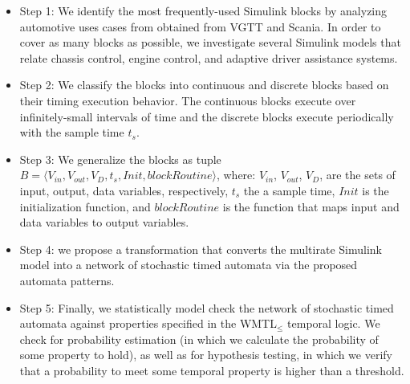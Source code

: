 \begin{itemize}
    \item Step 1: We identify the most frequently-used Simulink blocks by analyzing automotive uses cases from obtained from VGTT and Scania. In order to cover as many blocks as possible,  we investigate several Simulink models that relate chassis control, engine control, and adaptive driver assistance systems.
    \item Step 2: We classify the blocks into continuous and discrete blocks based on their timing execution behavior. The continuous blocks execute over infinitely-small intervals of time and the discrete blocks execute periodically with the sample time $t_s$.
    \item Step 3: We generalize the blocks as tuple $B = \langle V_{in}, V_{out}, V_D, t_s, Init, blockRoutine \rangle$, where: $V_{in}$, $V_{out}$, $V_D$,  are the sets of input, output, data variables, respectively, $t_s$ the a sample time, $Init$ is the initialization function, and $blockRoutine$ is the function that maps input and data variables to output variables.
    \item Step 4: we propose a transformation that converts the multirate Simulink model into a network of stochastic timed automata via the proposed automata patterns.
    \item Step 5: Finally, we statistically model check the network of stochastic timed automata against properties specified in the WMTL$_{\leq}$ temporal logic. We check for probability estimation (in which we calculate the probability of some property to hold), as well as for hypothesis testing, in which we verify that a probability to meet some temporal property is higher than a threshold. 
\end{itemize}

